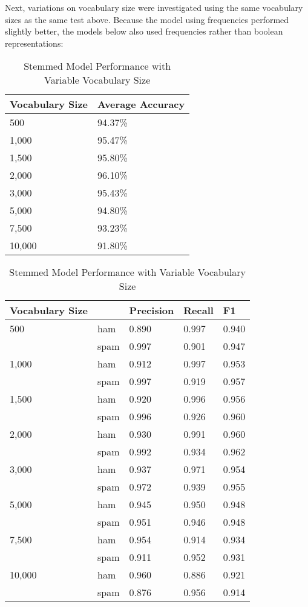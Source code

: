 \documentclass[a4paper]{article}
\begin{document}
	Next, variations on vocabulary size were investigated using the same vocabulary sizes as the same test above. Because the model using frequencies performed slightly better, the models below also used frequencies rather than boolean representations:
	
	\begin{table}[H]
		\centering
		\caption{Stemmed Model Performance with Variable Vocabulary Size}
		\begin{tabular}{ll}
			Vocabulary Size & Average Accuracy \\
			\hline
			500 & 94.37\% \\
			1,000 & 95.47\% \\
			1,500 & 95.80\% \\
			2,000 & 96.10\% \\
			3,000 & 95.43\% \\
			5,000 & 94.80\% \\
			7,500 & 93.23\% \\
			10,000 & 91.80\%
		\end{tabular}
		\begin{tabular}{l|llll}
			Vocabulary Size & & Precision & Recall & F1 \\
			\hline
			500 & ham  & 0.890 & 0.997 & 0.940 \\
			    & spam & 0.997 & 0.901 & 0.947 \\
			\hline
			1,000 & ham  & 0.912 & 0.997 & 0.953 \\
			      & spam & 0.997 & 0.919 & 0.957 \\
			\hline
			1,500 & ham  & 0.920 & 0.996 & 0.956 \\
		   	      & spam & 0.996 & 0.926 & 0.960 \\
 	        \hline
 	        2,000 & ham  & 0.930 & 0.991 & 0.960 \\
 	              & spam & 0.992 & 0.934 & 0.962 \\
			\hline
			3,000 & ham  & 0.937 & 0.971 & 0.954 \\
			      & spam & 0.972 & 0.939 & 0.955 \\
			\hline
			5,000 & ham  & 0.945 & 0.950 & 0.948 \\
			      & spam & 0.951 & 0.946 & 0.948 \\
			\hline
			7,500 & ham  & 0.954 & 0.914 & 0.934 \\
			      & spam & 0.911 & 0.952 & 0.931 \\
			\hline
			10,000 & ham  & 0.960 & 0.886 & 0.921 \\
			       & spam & 0.876 & 0.956 & 0.914
		\end{tabular}
	\end{table}
	
\end{document}
